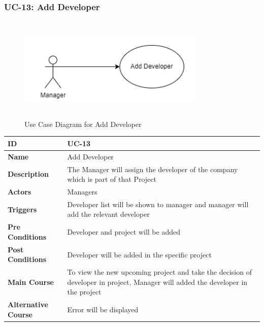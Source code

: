     \subsubsection{UC-13: Add Developer}
    \begin{figure}[H]
        \includegraphics[height=5cm, width=0.8\textwidth]{./diagrams/Use Case/u13.png}
        \centering 
        \caption{Use Case Diagram for Add Developer}
        \label{fig:Usecase1}
        \end{figure}
        
    \begin{center}
        \begin{tabularx}{\textwidth}{|l|X|}
            \hline
            \textbf{ID} & UC-13 \\
            \hline
            \textbf{Name} & Add Developer \\
            \hline
            \textbf{Description} & The Manager will assign the developer of the company which is part of that Project \\
            \hline
            \textbf{Actors} & Managers \\
            \hline
            \textbf{Triggers} & Developer list will be shown to manager and manager will add the relevant developer \\
            \hline
            \textbf{Pre Conditions} & Developer and project will be added \\
            \hline
            \textbf{Post Conditions} & Developer will be added in the specific project \\
            \hline
            \textbf{Main Course} & To view the new upcoming project and take the decision of developer in project, Manager will added the developer in the project \\
            \hline
            \textbf{Alternative Course} & Error will be displayed \\
            \hline
            
        \end{tabularx}
    \end{center}
    
